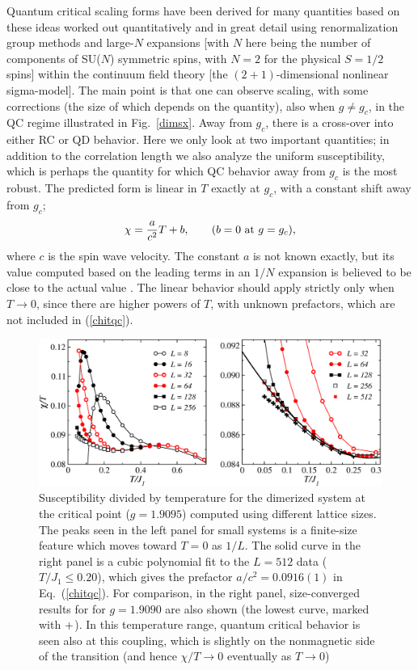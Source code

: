 \documentclass[draft,numberedheadings]{aipproc}
\begin{document}
Quantum critical scaling forms have been derived for many quantities based on these ideas worked out quantitatively and in great detail \cite{chubukov} 
using renormalization group methods and large-$N$ expansions [with $N$ here being the number of components of SU($N$) symmetric spins, with $N=2$ for the 
physical $S=1/2$ spins] within the continuum field theory [the $(2+1)$-dimensional nonlinear sigma-model]. The main point is that one can observe 
scaling, with some corrections (the size of which depends on the quantity), also when $g\not=g_c$, in the QC regime illustrated in Fig.~\ref{dimsx}. Away from 
$g_c$, there is a cross-over into either RC or QD behavior. Here we only look at two important quantities; in addition to the correlation length we also
analyze the uniform susceptibility, which is perhaps the quantity for which QC behavior away from $g_c$ is the most robust. The predicted form is
linear in $T$ exactly at $g_c$, with a constant shift away from $g_c$;
\begin{equation}
\chi = \frac{a}{c^2}T+b,~~~~~~(b=0~ {\rm at}~ g=g_c),
\label{chitqc}
\end{equation}
where $c$ is the spin wave velocity. The constant $a$ is not known exactly, but its value computed based on the leading terms in an $1/N$ expansion is
believed to be close to the actual value \cite{chubukov}. The linear behavior should apply strictly only when $T\to 0$, since there are higher powers 
of $T$, with unknown prefactors, which are not included in (\ref{chitqc}).

\begin{figure}
\includegraphics[width=13cm, clip]{dimtsusc1.eps}
\caption{Susceptibility divided by temperature for the dimerized system at the critical point ($g=1.9095$) computed using different lattice sizes. 
The peaks seen in the left panel for small systems is a finite-size feature which moves toward $T=0$ as $1/L$. The solid curve in the right panel is a 
cubic polynomial fit to the $L=512$ data ($T/J_1\le 0.20$), which gives the prefactor $a/c^2=0.0916(1)$ in Eq.~(\ref{chitqc}). For comparison, in the 
right panel, size-converged results for for $g=1.9090$ are also shown (the lowest curve, marked with ${\bf +}$). In this temperature range, quantum 
critical behavior is seen also at this coupling, which is slightly on the nonmagnetic side of the transition (and hence $\chi/T \to 0$ eventually 
as $T\to 0$)} 
\label{dimtsusc1}
\end{figure}
\end{document}
